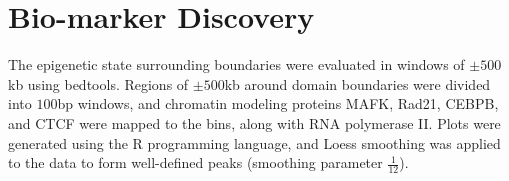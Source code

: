 \section*{Bio-marker Discovery}

The epigenetic state surrounding boundaries were evaluated in windows of $\pm500$kb using bedtools.  Regions of $\pm500$kb around
domain boundaries were divided into $100$bp windows, and chromatin modeling proteins MAFK, Rad21, CEBPB, and CTCF were mapped to
the bins, along with RNA polymerase II\@.  Plots were generated using the R programming language, and Loess smoothing was applied
to the data to form well-defined peaks (smoothing parameter $\frac{1}{12}$).
